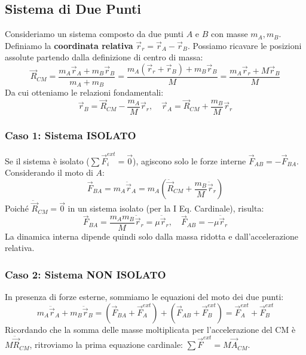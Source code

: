 \subsection{Sistema di Due Punti}
Consideriamo un sistema composto da due punti $A$ e $B$ con masse $m_A, m_B$. Definiamo la \textbf{coordinata relativa} $\vec{r}_r = \vec{r}_A - \vec{r}_B$. Possiamo ricavare le posizioni assolute partendo dalla definizione di centro di massa:
\begin{equation}
    \vec{R}_{CM} = \frac{m_A \vec{r}_A + m_B \vec{r}_B}{m_A + m_B} = \frac{m_A (\vec{r}_r + \vec{r}_B) + m_B \vec{r}_B}{M} = \frac{m_A \vec{r}_r + M \vec{r}_B}{M}
\end{equation}
Da cui otteniamo le relazioni fondamentali:
\begin{equation}
    \vec{r}_B = \vec{R}_{CM} - \frac{m_A}{M} \vec{r}_r, \quad \vec{r}_A = \vec{R}_{CM} + \frac{m_B}{M} \vec{r}_r
\end{equation}

\subsubsection{Caso 1: Sistema ISOLATO}
Se il sistema è isolato ($\sum \vec{F}_i^{ext} = \vec{0}$), agiscono solo le forze interne $\vec{F}_{AB} = -\vec{F}_{BA}$. Considerando il moto di $A$:
\begin{equation}
    \vec{F}_{BA} = m_A \ddot{\vec{r}}_A = m_A \left( \ddot{\vec{R}}_{CM} + \frac{m_B}{M} \ddot{\vec{r}}_r \right)
\end{equation}
Poiché $\ddot{\vec{R}}_{CM} = \vec{0}$ in un sistema isolato (per la I Eq. Cardinale), risulta:
\begin{equation}
    \vec{F}_{BA} = \frac{m_A m_B}{M} \ddot{\vec{r}}_r = \mu \ddot{\vec{r}}_r, \quad \vec{F}_{AB} = -\mu \ddot{\vec{r}}_r
\end{equation}
La dinamica interna dipende quindi solo dalla massa ridotta e dall'accelerazione relativa.

\subsubsection{Caso 2: Sistema NON ISOLATO}
In presenza di forze esterne, sommiamo le equazioni del moto dei due punti:
\begin{equation}
    m_A \ddot{\vec{r}}_A + m_B \ddot{\vec{r}}_B = (\vec{F}_{BA} + \vec{F}_A^{ext}) + (\vec{F}_{AB} + \vec{F}_B^{ext}) = \vec{F}_A^{ext} + \vec{F}_B^{ext}
\end{equation}
Ricordando che la somma delle masse moltiplicata per l'accelerazione del CM è $M \ddot{\vec{R}}_{CM}$, ritroviamo la prima equazione cardinale: $\sum \vec{F}^{ext} = M \vec{A}_{CM}$.

